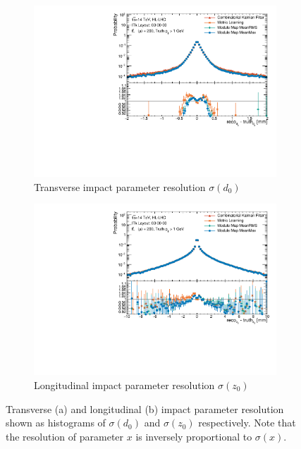 \begin{figure}[h!]
\centering
\begin{subfigure}[b]{0.65\textwidth}
    \centering
    \includegraphics[width=\textwidth]{figures/ckf-gnn/Matched/Resolutions/Primary/res_d0.pdf}
    \caption{Transverse impact parameter resolution $\sigma(d_0)$}
    \label{subfig:res-d0}
\end{subfigure}
\begin{subfigure}[b]{0.65\textwidth}
    \centering
    \includegraphics[width=\textwidth]{figures/ckf-gnn/Matched/Resolutions/Primary/res_z0.pdf}
    \caption{Longitudinal impact parameter resolution $\sigma(z_0)$}
    \label{subfig:res-z0}
\end{subfigure}
    \caption{Transverse (a) and longitudinal (b) impact parameter resolution shown as histograms of $\sigma(d_0)$ and $\sigma(z_0)$ respectively. Note that the resolution of parameter $x$ is inversely proportional to $\sigma(x)$.}
    \label{fig:res-d0-z0}
\end{figure}

